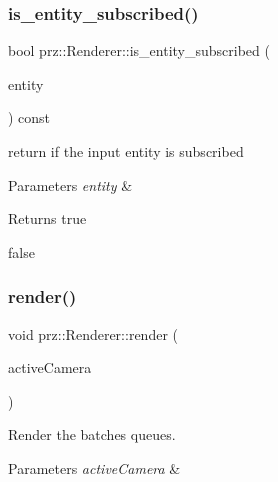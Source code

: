 \subsubsection{\texorpdfstring{is\_entity\_subscribed()}{is\_entity\_subscribed()}\hspace{0.1cm}{\footnotesize\ttfamily [2/2]}}
{\footnotesize\ttfamily bool prz\+::\+Renderer\+::is\+\_\+entity\+\_\+subscribed (\begin{DoxyParamCaption}\item[{P\+S\+Ptr$<$ \mbox{\hyperlink{classprz_1_1_entity}{Entity}} $>$}]{entity }\end{DoxyParamCaption}) const}



return if the input entity is subscribed 


\begin{DoxyParams}{Parameters}
{\em entity} & \\
\hline
\end{DoxyParams}
\begin{DoxyReturn}{Returns}
true 

false 
\end{DoxyReturn}
\mbox{\label{classprz_1_1_renderer_a1b1894524e453b510ef23fec58aa12a2}} 
\subsubsection{\texorpdfstring{render()}{render()}}
{\footnotesize\ttfamily void prz\+::\+Renderer\+::render (\begin{DoxyParamCaption}\item[{const P\+S\+Ptr$<$ \mbox{\hyperlink{classprz_1_1_camera}{Camera}} $>$}]{active\+Camera }\end{DoxyParamCaption})}



Render the batches queues. 


\begin{DoxyParams}{Parameters}
{\em active\+Camera} & \\
\hline
\end{DoxyParams}
\mbox{\label{classprz_1_1_renderer_a479da300bc28d8d22ac26cbed51423f4}} 
